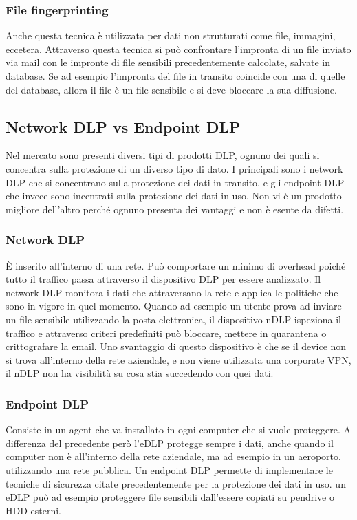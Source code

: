     \subsubsection{File fingerprinting}
    Anche questa tecnica è utilizzata per dati non strutturati come file, immagini, eccetera.
    Attraverso questa tecnica si può confrontare l'impronta di un file inviato via mail con 
    le impronte di file sensibili precedentemente calcolate, salvate in database.
    Se ad esempio l'impronta del file in transito coincide con una di quelle del database,
    allora il file è un file sensibile e si deve bloccare la sua diffusione.

\subsection{Network DLP vs Endpoint DLP}
    Nel mercato sono presenti diversi tipi di prodotti DLP, ognuno dei quali si concentra sulla protezione
    di un diverso tipo di dato. I principali sono i network DLP che si concentrano sulla protezione dei dati
    in transito, e gli endpoint DLP che invece sono incentrati sulla protezione dei dati in uso.
    Non vi è un prodotto migliore dell'altro perché ognuno presenta dei vantaggi e non è esente da difetti.

    \subsubsection{Network DLP}
            È inserito all'interno di una rete. Può comportare un minimo di overhead poiché tutto il traffico
            passa attraverso il dispositivo DLP per essere analizzato.
            Il network DLP monitora i dati che attraversano la rete e applica le politiche che sono in vigore
            in quel momento. Quando ad esempio un utente prova ad inviare un file sensibile utilizzando la posta
            elettronica, il  dispositivo nDLP ispeziona il traffico e attraverso criteri predefiniti 
            può bloccare, mettere in quarantena o crittografare la email.
            Uno svantaggio di questo dispositivo è che se il device non si trova all'interno della rete aziendale,
            e non viene utilizzata una corporate VPN, il nDLP non ha visibilità su cosa stia succedendo con quei 
            dati.

    \subsubsection{Endpoint DLP}
            Consiste in un agent che va installato in ogni computer che si vuole proteggere. A differenza del precedente 
            però l'eDLP protegge sempre i dati, anche quando il computer non è all'interno della rete aziendale, ma ad esempio in un 
            aeroporto, utilizzando una rete pubblica. Un endpoint DLP permette di implementare le tecniche di sicurezza
            citate precedentemente per la protezione dei dati in uso. un eDLP può ad esempio proteggere file sensibili 
            dall'essere copiati su pendrive o HDD esterni.
    
